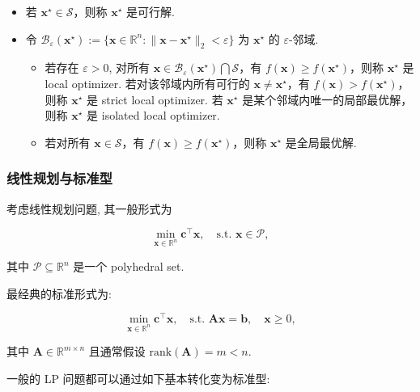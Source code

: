 \begin{itemize}
\item {}若 $\bm{x}^\star \in \mathcal{S}$，则称 $\bm{x}^\star$ 是可行解.


\item {}令 $\mathcal{B}_\varepsilon(\bm{x}^\star) := \{\bm{x} \in \mathbb{R}^n: \|\bm{x}-\bm{x}^\star\|_2 < \varepsilon\}$ 为 $\bm{x}^\star$ 的 $\varepsilon$-邻域.

\begin{itemize}
\item {}若存在 $\varepsilon > 0$, 对所有 $\bm{x} \in \mathcal{B}_\varepsilon(\bm{x}^\star) \bigcap \mathcal{S}$，有 $f(\bm{x}) \geq f(\bm{x}^\star)$，则称 $\bm{x}^\star$ 是 local optimizer. 若对该邻域内所有可行的 $\bm{x} \neq \bm{x}^\star$，有 $f(\bm{x}) > f(\bm{x}^\star)$，则称 $\bm{x}^\star$ 是 strict local optimizer. 若 $\bm{x}^\star$ 是某个邻域内唯一的局部最优解，则称 $\bm{x}^\star$ 是 isolated local optimizer.


\item {}若对所有 $\bm{x} \in \mathcal{S}$，有 $f(\bm{x}) \geq f(\bm{x}^\star)$，则称 $\bm{x}^\star$ 是全局最优解.


\end{itemize}


\end{itemize}

\subsubsection{线性规划与标准型}

考虑线性规划问题, 其一般形式为

\[
\min_{\bm{x} \in \mathbb{R}^n} \bm{c}^\top \bm{x}, \quad \text{s.t. } \bm{x} \in \mathcal{P},
\]

其中 $\mathcal{P} \subseteq \mathbb{R}^n$ 是一个 polyhedral set.

最经典的标准形式为:

\[
\min_{\bm{x} \in \mathbb{R}^n} \bm{c}^\top \bm{x}, \quad \text{s.t. } \bm{A}\bm{x} = \bm{b}, \quad \bm{x} \geq 0,
\]

其中 $\bm{A} \in \mathbb{R}^{m \times n}$ 且通常假设 $\text{rank}(\bm{A}) = m < n$.

一般的 LP 问题都可以通过如下基本转化变为标准型:

